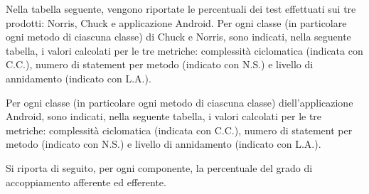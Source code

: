 			Nella tabella seguente, vengono riportate le percentuali dei test effettuati sui tre prodotti: Norris, Chuck e applicazione Android.
			Per ogni classe (in particolare ogni metodo di ciascuna classe) di Chuck e Norris, sono indicati, nella seguente tabella, i valori calcolati per le tre metriche: complessità ciclomatica (indicata con C.C.), numero di statement per metodo (indicato con N.S.) e livello di annidamento (indicato con L.A.).
				
			Per ogni classe (in particolare ogni metodo di ciascuna classe) diell'applicazione Android, sono indicati, nella seguente tabella, i valori calcolati per le tre metriche: complessità ciclomatica (indicata con C.C.), numero di statement per metodo (indicato con N.S.) e livello di annidamento (indicato con L.A.).
				
			Si riporta di seguito, per ogni componente, la percentuale del grado di accoppiamento afferente ed efferente.
			 
